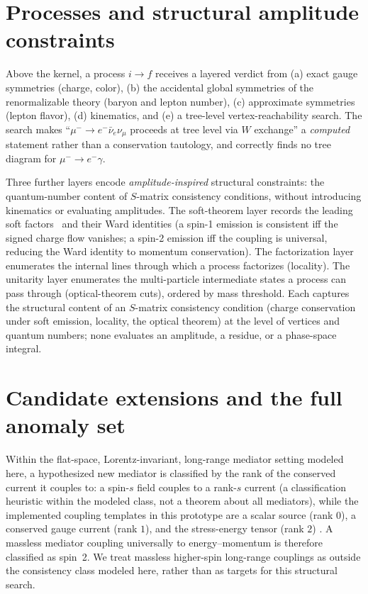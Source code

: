 \documentclass[11pt]{article}
\begin{document}
\section{Processes and structural amplitude constraints}

Above the kernel, a process $i\to f$ receives a layered verdict from (a) exact
gauge symmetries (charge, color), (b) the accidental global symmetries of the
renormalizable theory (baryon and lepton number), (c) approximate symmetries
(lepton flavor), (d) kinematics, and (e) a tree-level vertex-reachability search.
The search makes ``$\mu^-\!\to e^-\bar\nu_e\nu_\mu$ proceeds at tree level via
$W$ exchange'' a \emph{computed} statement rather than a conservation tautology,
and correctly finds no tree diagram for $\mu^-\!\to e^-\gamma$.

Three further layers encode \emph{amplitude-inspired} structural constraints:
the quantum-number content of $S$-matrix consistency conditions, without
introducing kinematics or evaluating amplitudes. The soft-theorem layer records
the leading soft factors~\cite{weinbergsoft} and their Ward identities (a
spin-1 emission is consistent iff the signed charge flow vanishes; a spin-2
emission iff the coupling is universal, reducing the Ward identity to momentum
conservation). The factorization layer enumerates the internal lines through
which a process factorizes (locality). The unitarity layer enumerates the
multi-particle intermediate states a process can pass through (optical-theorem
cuts), ordered by mass threshold. Each captures the structural content of an
$S$-matrix consistency condition (charge conservation under soft emission,
locality, the optical theorem) at the level of vertices and quantum numbers;
none evaluates an amplitude, a residue, or a phase-space integral.

\section{Candidate extensions and the full anomaly set}

Within the flat-space, Lorentz-invariant, long-range mediator setting modeled
here, a hypothesized new mediator is classified by the rank of the conserved
current it couples to: a spin-$s$ field couples to a rank-$s$ current (a
classification heuristic within the modeled class, not a theorem about all
mediators), while the implemented coupling templates in this prototype are a
scalar source (rank $0$), a conserved gauge current (rank $1$), and the
stress-energy tensor (rank $2$)
\cite{colemanmandula,weinbergwitten}. A massless mediator coupling universally
to energy--momentum is therefore classified as spin~2. We treat massless
higher-spin long-range couplings as outside the consistency class modeled here,
rather than as targets for this structural search.
\end{document}
